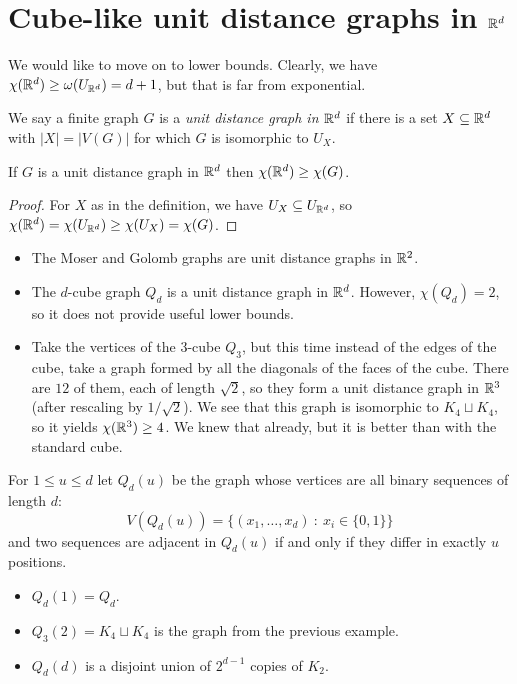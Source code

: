 \section{Cube-like unit distance graphs in $\mathbb{R}^d$}
We would like to move on to lower bounds. Clearly, we have $\chi(\mathbb{R}^d)\geq \omega(U_{\mathbb{R}^d})=d+1$, but that is far from exponential. 

\begin{definition}
We say a finite graph $G$ is a \emph{unit distance graph in $\mathbb{R}^d$} if there is a set $X\subseteq \mathbb{R}^d$  with $|X|=|V(G)|$ for which $G$ is isomorphic to $U_X$.
\end{definition}

\begin{lemma}
If $G$ is a unit distance graph in $\mathbb{R}^d$ then $\chi(\mathbb{R}^d)\geq \chi(G)$.
\end{lemma}
\begin{proof} For $X$ as in the definition, we have
$U_X\subseteq U_{\mathbb{R}^d}$, so $\chi(\mathbb{R}^d)=\chi(U_{\mathbb{R}^d})\geq \chi(U_X)=\chi(G)$.
\end{proof}

\begin{example}
\begin{itemize}
\item The Moser and Golomb graphs are unit distance graphs in $\mathbb{R}^2$.
\item The $d$-cube graph $Q_d$ is a unit distance graph in $\mathbb{R}^d$. However, $\chi(Q_d)=2$, so it does not provide useful lower bounds.
\item Take the vertices of the $3$-cube $Q_3$, but this time instead of the edges of the cube, take a graph formed by all the diagonals of the faces of the cube. There are $12$ of them, each of length $\sqrt{2}$, so they form a unit distance graph in $\mathbb{R}^3$ (after rescaling by $1/\sqrt{2}$). We see that this graph  is isomorphic to $K_4\sqcup K_4$, so it yields $\chi(\mathbb{R}^3)\geq 4$. We knew that already, but it is better than with the standard cube.
\end{itemize}
\end{example}

\begin{definition}
For $1\leq u\leq d$ let $Q_d(u)$ be the graph whose vertices are all binary sequences of length $d$:
$$V(Q_d(u))=\{(x_1,\ldots,x_d)~:~x_i\in\{0,1\}\}$$
and two sequences are adjacent in $Q_d(u)$ if and only if they differ in exactly $u$ positions.
\end{definition}
\begin{example}
\begin{itemize}
\item $Q_d(1)=Q_d$.
\item $Q_3(2)=K_4\sqcup K_4$ is the graph from the previous example.
\item $Q_d(d)$ is a disjoint union of $2^{d-1}$ copies of $K_2$.
\end{itemize}
\end{example}

